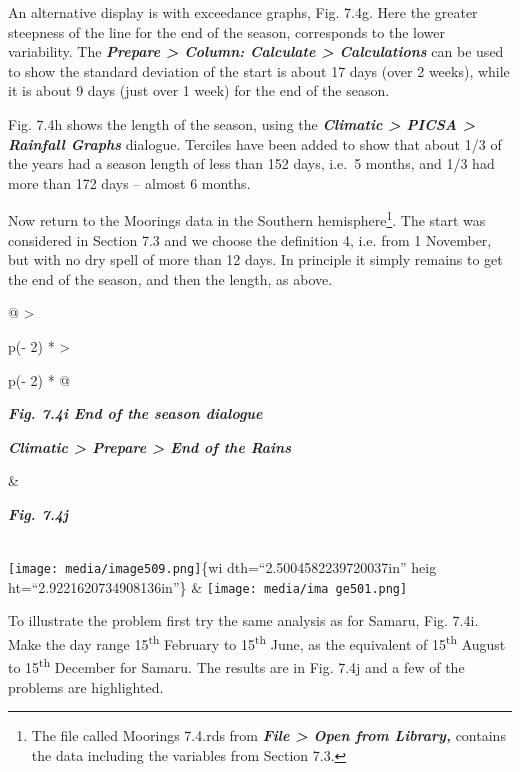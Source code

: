 \documentclass[
  letterpaper,
  DIV=11,
  numbers=noendperiod]{scrreprt}
\begin{document}
An alternative display is with exceedance graphs, Fig. 7.4g. Here the
greater steepness of the line for the end of the season, corresponds to
the lower variability. The \textbf{\emph{Prepare \textgreater{} Column:
Calculate \textgreater{} Calculations}} can be used to show the standard
deviation of the start is about 17 days (over 2 weeks), while it is
about 9 days (just over 1 week) for the end of the season.

Fig. 7.4h shows the length of the season, using the
\textbf{\emph{Climatic \textgreater{} PICSA \textgreater{} Rainfall
Graphs}} dialogue. Terciles have been added to show that about 1/3 of
the years had a season length of less than 152 days, i.e.~5 months, and
1/3 had more than 172 days -- almost 6 months.

Now return to the Moorings data in the Southern hemisphere\footnote{The
  file called Moorings 7.4.rds from \textbf{\emph{File \textgreater{}
  Open from Library,}} contains the data including the variables from
  Section 7.3.}. The start was considered in Section 7.3 and we choose
the definition 4, i.e. from 1 November, but with no dry spell of more
than 12 days. In principle it simply remains to get the end of the
season, and then the length, as above.

\begin{longtable}[]{@{}
  >{\raggedright\arraybackslash}p{(\columnwidth - 2\tabcolsep) * }
  >{\raggedright\arraybackslash}p{(\columnwidth - 2\tabcolsep) * }@{}}
\toprule\noalign{}
\begin{minipage}[b]{\linewidth}\raggedright
\textbf{\emph{Fig. 7.4i End of the season dialogue}}

\textbf{\emph{Climatic \textgreater{} Prepare \textgreater{} End of the
Rains}}
\end{minipage} & \begin{minipage}[b]{\linewidth}\raggedright
\textbf{\emph{Fig. 7.4j}}
\end{minipage} \\
\midrule\noalign{}
\endhead
\bottomrule\noalign{}
\endlastfoot
\texttt{[image: media/image509.png]}\{wi dth=``2.5004582239720037in''
heig ht=``2.9221620734908136in''\} &
\texttt{[image: media/ima ge501.png]} \\
\end{longtable}

To illustrate the problem first try the same analysis as for Samaru,
Fig. 7.4i. Make the day range 15\textsuperscript{th} February to
15\textsuperscript{th} June, as the equivalent of 15\textsuperscript{th}
August to 15\textsuperscript{th} December for Samaru. The results are in
Fig. 7.4j and a few of the problems are highlighted.
\end{document}
